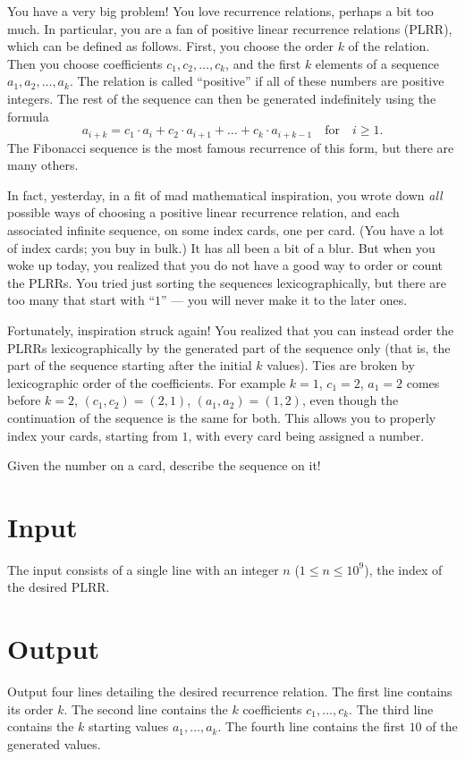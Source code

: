 
You have a very big problem! You love recurrence relations, perhaps
a bit too much. In particular, you are a fan of positive linear
recurrence relations (PLRR), which can be defined as follows. First,
you choose the order $k$ of the relation. Then you choose coefficients
$c_1, c_2, \dots, c_k$, and the first $k$ elements of a sequence $a_1,
a_2, \dots, a_k$. The relation is called ``positive'' if all of these
numbers are positive integers. The rest of the sequence can then be
generated indefinitely using the formula
$$
a_{i+k} = c_1 \cdot a_i + c_2 \cdot a_{i+1} + \dots + c_k \cdot a_{i+k-1} \quad\text{for}\quad i \geq 1.
$$
The Fibonacci sequence is the most famous recurrence of this form, but
there are many others.

In fact, yesterday, in a fit of mad mathematical inspiration, you
wrote down {\em all} possible ways of choosing a positive linear
recurrence relation, and each associated infinite sequence, on some
index cards, one per card. (You have a lot of index cards; you buy in
bulk.) It has all been a bit of a blur. But when you woke up today, you
realized that you do not have a good way to order or count the
PLRRs. You tried just sorting the sequences lexicographically, but
there are too many that start with ``$1$'' --- you will never make it to
the later ones.

Fortunately, inspiration struck again! You realized that you can
instead order the PLRRs lexicographically by the generated part of the
sequence only (that is, the part of the sequence starting after the
initial $k$ values). Ties are broken by lexicographic order of the
coefficients.  For example $k=1$, $c_1=2$, $a_1=2$ comes before $k=2$,
$(c_1,c_2)=(2,1)$, $(a_1,a_2)=(1,2)$, even though the continuation of
the sequence is the same for both. This allows you to properly index
your cards, starting from $1$, with every card being assigned a
number.

Given the number on a card, describe the sequence on it!

\section*{Input}

The input consists of a single line with an integer $n$ ($1 \leq n
\leq 10^9$), the index of the desired PLRR.

\section*{Output}

Output four lines detailing the desired recurrence relation. The first
line contains its order $k$. The second line contains the
$k$ coefficients $c_1, \dots, c_k$. The third line contains the
$k$ starting values $a_1, \dots, a_k$. The fourth line contains
the first $10$ of the generated values.
